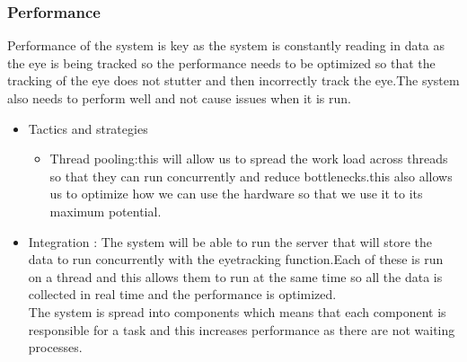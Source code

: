 \subsubsection{Performance}
\begin{flushleft}
Performance of the system is key as the system is constantly reading in data as the eye is being tracked so the performance needs to be optimized so that the tracking of the eye does not stutter and then incorrectly track the eye.The system also needs to perform well and not cause issues when it is run.
\begin{itemize}
\item{Tactics and strategies}
\begin{itemize}
\item{Thread pooling}:this will allow us to spread the work load across threads so that they can run concurrently and reduce bottlenecks.this also allows us to optimize how we can use the hardware so that we use it to its maximum potential.
\end{itemize}

\item{Integration} :
The system will be able to run the server that will store the data to run concurrently with the eyetracking function.Each of these is run on a thread and this allows them to run at the same time so all the data is collected in real time and the performance is optimized.\\
The system is spread into components which means that each component is responsible for a task and this increases performance as there are not waiting processes.
\end{itemize}

\end{flushleft}
		
